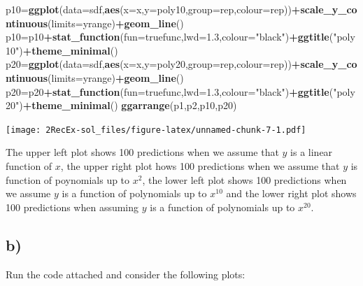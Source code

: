 \documentclass[]{article}
\newenvironment{Shaded}{\begin{snugshade}}{\end{snugshade}}
\newcommand{\KeywordTok}[1]{\textcolor[rgb]{0.13,0.29,0.53}{\textbf{#1}}}
\newcommand{\DataTypeTok}[1]{\textcolor[rgb]{0.13,0.29,0.53}{#1}}
\newcommand{\FloatTok}[1]{\textcolor[rgb]{0.00,0.00,0.81}{#1}}
\newcommand{\StringTok}[1]{\textcolor[rgb]{0.31,0.60,0.02}{#1}}
\newcommand{\OperatorTok}[1]{\textcolor[rgb]{0.81,0.36,0.00}{\textbf{#1}}}
\newcommand{\NormalTok}[1]{#1}
\begin{document}
\begin{Shaded}
\begin{Highlighting}[]
\NormalTok{p10=}\KeywordTok{ggplot}\NormalTok{(}\DataTypeTok{data=}\NormalTok{sdf,}\KeywordTok{aes}\NormalTok{(}\DataTypeTok{x=}\NormalTok{x,}\DataTypeTok{y=}\NormalTok{poly10,}\DataTypeTok{group=}\NormalTok{rep,}\DataTypeTok{colour=}\NormalTok{rep))}\OperatorTok{+}\KeywordTok{scale_y_continuous}\NormalTok{(}\DataTypeTok{limits=}\NormalTok{yrange)}\OperatorTok{+}\KeywordTok{geom_line}\NormalTok{()}
\NormalTok{p10=p10}\OperatorTok{+}\KeywordTok{stat_function}\NormalTok{(}\DataTypeTok{fun=}\NormalTok{truefunc,}\DataTypeTok{lwd=}\FloatTok{1.3}\NormalTok{,}\DataTypeTok{colour=}\StringTok{"black"}\NormalTok{)}\OperatorTok{+}\KeywordTok{ggtitle}\NormalTok{(}\StringTok{"poly10"}\NormalTok{)}\OperatorTok{+}\KeywordTok{theme_minimal}\NormalTok{()}
\NormalTok{p20=}\KeywordTok{ggplot}\NormalTok{(}\DataTypeTok{data=}\NormalTok{sdf,}\KeywordTok{aes}\NormalTok{(}\DataTypeTok{x=}\NormalTok{x,}\DataTypeTok{y=}\NormalTok{poly20,}\DataTypeTok{group=}\NormalTok{rep,}\DataTypeTok{colour=}\NormalTok{rep))}\OperatorTok{+}\KeywordTok{scale_y_continuous}\NormalTok{(}\DataTypeTok{limits=}\NormalTok{yrange)}\OperatorTok{+}\KeywordTok{geom_line}\NormalTok{()}
\NormalTok{p20=p20}\OperatorTok{+}\KeywordTok{stat_function}\NormalTok{(}\DataTypeTok{fun=}\NormalTok{truefunc,}\DataTypeTok{lwd=}\FloatTok{1.3}\NormalTok{,}\DataTypeTok{colour=}\StringTok{"black"}\NormalTok{)}\OperatorTok{+}\KeywordTok{ggtitle}\NormalTok{(}\StringTok{"poly20"}\NormalTok{)}\OperatorTok{+}\KeywordTok{theme_minimal}\NormalTok{()}
\KeywordTok{ggarrange}\NormalTok{(p1,p2,p10,p20)}
\end{Highlighting}
\end{Shaded}

\texttt{[image: 2RecEx-sol\_files/figure-latex/unnamed-chunk-7-1.pdf]}

The upper left plot shows 100 predictions when we assume that \(y\) is a
linear function of \(x\), the upper right plot hows 100 predictions when
we assume that \(y\) is function of poynomials up to \(x^2\), the lower
left plot shows 100 predictions when we assume \(y\) is a function of
polynomials up to \(x^{10}\) and the lower right plot shows 100
predictions when assuming \(y\) is a function of polynomials up to
\(x^{20}\).

\subsection{b)}\label{b}

Run the code attached and consider the following plots:
\end{document}
